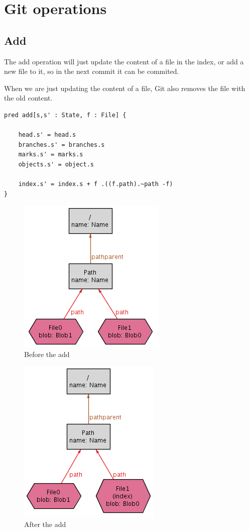 \section{Git operations}

\subsection{Add}

The add operation will just update the content of a file in the index, 
or add a new file to it, so in the next commit it can be commited. \par
When we are just updating the content of a file, Git also removes the file
with the old content.

\begin{lstlisting}
pred add[s,s' : State, f : File] {
	
	head.s' = head.s
	branches.s' = branches.s
	marks.s' = marks.s
	objects.s' = object.s

	index.s' = index.s + f .((f.path).~path -f)
}
\end{lstlisting}

\begin{figure}[h!] 
	\caption{Before the add}
	\centering
	\includegraphics[scale=0.65]{images/add1.png}
\end{figure}

\begin{figure}[h!] 
	\caption{After the add}
	\centering
	\includegraphics[scale=0.65]{images/add2.png}
\end{figure}

